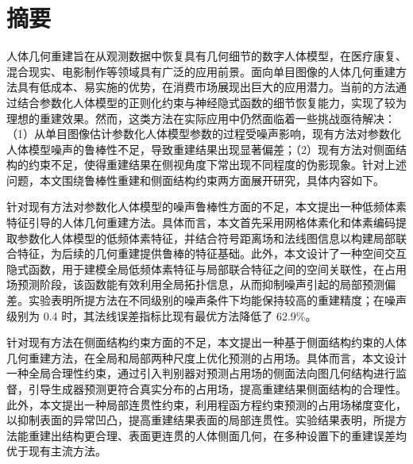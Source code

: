 \chapter[摘要]{摘\quad 要} 
\setlength{\parindent}{2em}

人体几何重建旨在从观测数据中恢复具有几何细节的数字人体模型，在医疗康复、混合现实、电影制作等领域具有广泛的应用前景。面向单目图像的人体几何重建方法具有低成本、易实施的优势，在消费市场展现出巨大的应用潜力。当前的方法通过结合参数化人体模型的正则化约束与神经隐式函数的细节恢复能力，实现了较为理想的重建效果。然而，这类方法在实际应用中仍然面临着一些挑战亟待解决：（1）从单目图像估计参数化人体模型参数的过程受噪声影响，现有方法对参数化人体模型噪声的鲁棒性不足，导致重建结果出现显著偏差；（2）现有方法对侧面结构的约束不足，使得重建结果在侧视角度下常出现不同程度的伪影现象。针对上述问题，本文围绕鲁棒性重建和侧面结构约束两方面展开研究，具体内容如下。

针对现有方法对参数化人体模型的噪声鲁棒性方面的不足，本文提出一种低频体素特征引导的人体几何重建方法。具体而言，本文首先采用网格体素化和体素编码提取参数化人体模型的低频体素特征，并结合符号距离场和法线图信息以构建局部联合特征，为后续的几何重建提供鲁棒的特征基础。此外，本文设计了一种空间交互隐式函数，用于建模全局低频体素特征与局部联合特征之间的空间关联性，在占用场预测阶段，该函数能有效利用全局拓扑信息，从而抑制噪声引起的局部预测偏差。实验表明所提方法在不同级别的噪声条件下均能保持较高的重建精度；在噪声级别为 0.4 时，其法线误差指标比现有最优方法降低了 62.9\%。

针对现有方法在侧面结构约束方面的不足，本文提出一种基于侧面结构约束的人体几何重建方法，在全局和局部两种尺度上优化预测的占用场。具体而言，本文设计一种全局合理性约束，通过引入判别器对预测占用场的侧面法向图几何结构进行监督，引导生成器预测更符合真实分布的占用场，提高重建结果侧面结构的合理性。此外，本文提出一种局部连贯性约束，利用程函方程约束预测的占用场梯度变化，以抑制表面的异常凹凸，提高重建结果表面的局部连贯性。实验结果表明，所提方法能重建出结构更合理、表面更连贯的人体侧面几何，在多种设置下的重建误差均优于现有主流方法。


